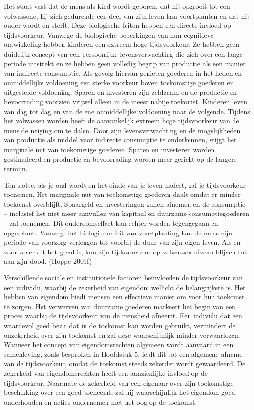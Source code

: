 \documentclass[
  a5paper,
  smalldemyvopaper,11pt,twoside,onecolumn,openright,extrafontsizes,
hidelinks]{memoir}
\begin{document}
Het staat vast dat de mens als kind wordt geboren, dat hij opgroeit tot
een volwassene, hij zich gedurende een deel van zijn leven kan
voortplanten en dat hij ouder wordt en sterft. Deze biologische feiten
hebben een directe invloed op tijdsvoorkeur. Vanwege de biologische
beperkingen van hun cognitieve ontwikkeling hebben kinderen een extreem
hoge tijdsvoorkeur. Ze hebben geen duidelijk concept van een
persoonlijke levensverwachting die zich over een lange periode uitstrekt
en ze hebben geen volledig begrip van productie als een manier van
indirecte consumptie. Als gevolg hiervan genieten goederen in het heden
en onmiddellijke voldoening een sterke voorkeur boven toekomstige
goederen en uitgestelde voldoening. Sparen en investeren zijn zeldzaam
en de productie en bevoorrading voorzien vrijwel alleen in de meest
nabije toekomst. Kinderen leven van dag tot dag en van de ene
onmiddellijke voldoening naar de volgende. Tijdens het volwassen worden
heeft de aanvankelijk extreem hoge tijdsvoorkeur van de mens de neiging
om te dalen. Door zijn levensverwachting en de mogelijkheden van
productie als middel voor indirecte consumptie te onderkennen, stijgt
het marginale nut van toekomstige goederen. Sparen en investeren worden
gestimuleerd en productie en bevoorrading worden meer gericht op de
langere termijn.

Ten slotte, als je oud wordt en het einde van je leven nadert, zal je
tijdsvoorkeur toenemen. Het marginale nut van toekomstige goederen daalt
omdat er minder toekomst overblijft. Spaargeld en investeringen zullen
afnemen en de consumptie -- inclusief het niet meer aanvullen van
kapitaal en duurzame consumptiegoederen -- zal toenemen. Dit
ouderdomseffect kan echter worden tegengegaan en opgeschort. Vanwege het
biologische feit van voortplanting kan de mens zijn periode van voorzorg
verlengen tot voorbij de duur van zijn eigen leven. Als en voor zover
dit het geval is, kan zijn tijdsvoorkeur op volwassen niveau blijven tot
aan zijn dood. (Hoppe 2001f)

Verschillende sociale en institutionele factoren beïnvloeden de
tijdsvoorkeur van een individu, waarbij de zekerheid van eigendom
wellicht de belangrijkste is. Het hebben van eigendom biedt mensen een
effectieve manier om voor hun toekomst te zorgen. Het verwerven van
duurzame goederen markeert het begin van een proces waarbij de
tijdsvoorkeur van de mensheid afneemt. Een individu dat een waardevol
goed bezit dat in de toekomst kan worden gebruikt, vermindert de
onzekerheid over zijn toekomst en zal deze waarschijnlijk minder
verwaarlozen. Wanneer het concept van eigendomsrechten algemeen wordt
aanvaard in een samenleving, zoals besproken in Hoofdstuk 5, leidt dit
tot een algemene afname van de tijdsvoorkeur, omdat de toekomst steeds
zekerder wordt gewaardeerd. De zekerheid van eigendomsrechten heeft een
aanzienlijke invloed op de tijdsvoorkeur. Naarmate de zekerheid van een
eigenaar over zijn toekomstige beschikking over een goed toeneemt, zal
hij waarschijnlijk het eigendom goed onderhouden en acties ondernemen
met het oog op de toekomst.
\end{document}
